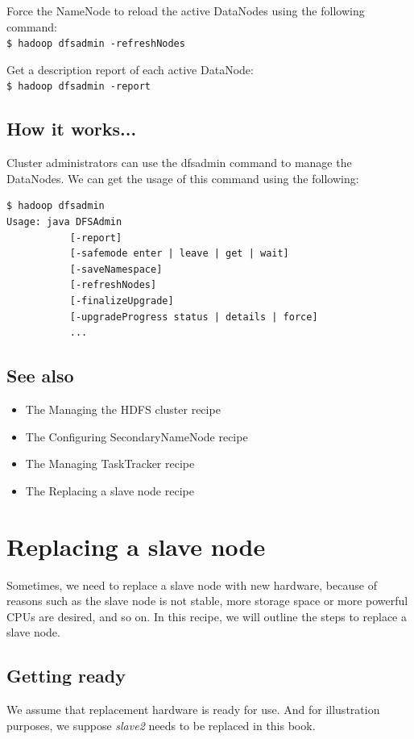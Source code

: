Force the NameNode to reload the active DataNodes using the following command: \\
\verb|$ hadoop dfsadmin -refreshNodes|

Get a description report of each active DataNode: \\
\verb|$ hadoop dfsadmin -report|

\subsection*{How it works...}
Cluster administrators can use the dfsadmin command to manage the DataNodes. We can get the usage of this command using the following:
\lstset{style=bashstyle}
\begin{lstlisting}
$ hadoop dfsadmin
Usage: java DFSAdmin
           [-report]
           [-safemode enter | leave | get | wait]
           [-saveNamespace]
           [-refreshNodes]
           [-finalizeUpgrade]
           [-upgradeProgress status | details | force]
           ...
\end{lstlisting}
\subsection*{See also}
\begin{itemize}
  \item The Managing the HDFS cluster recipe
  \item The Configuring SecondaryNameNode recipe
  \item The Managing TaskTracker recipe
  \item The Replacing a slave node recipe
\end{itemize}

\section{Replacing a slave node}
Sometimes, we need to replace a slave node with new hardware, because of reasons such as the slave node is not stable, more storage space or more powerful CPUs are desired, and so on. In this recipe, we will outline the steps to replace a slave node.

\subsection*{Getting ready}
We assume that replacement hardware is ready for use. And for illustration purposes, we suppose \emph{slave2} needs to be replaced in this book.

